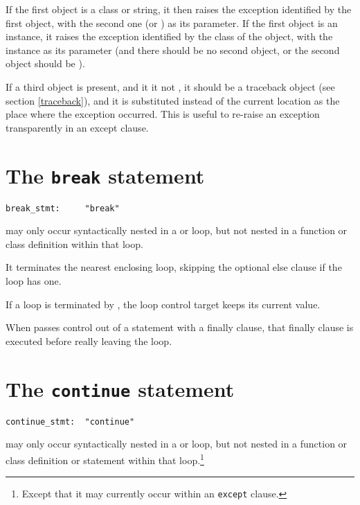 If the first object is a class or string, it then raises the exception
identified by the first object, with the second one (or )
as its parameter.  If the first object is an instance, it raises the
exception identified by the class of the object, with the instance as
its parameter (and there should be no second object, or the second
object should be ).

If a third object is present, and it it not , it should be
a traceback object (see section \ref{traceback}), and it is
substituted instead of the current location as the place where the
exception occurred.  This is useful to re-raise an exception
transparently in an except clause.

\section{The {\tt break} statement}

\begin{verbatim}
break_stmt:     "break"
\end{verbatim}

 may only occur syntactically nested in a 
or  loop, but not nested in a function or class definition
within that loop.

It terminates the nearest enclosing loop, skipping the optional
else clause if the loop has one.

If a  loop is terminated by , the loop control
target keeps its current value.

When  passes control out of a  statement
with a finally clause, that finally clause is executed
before really leaving the loop.

\section{The {\tt continue} statement}

\begin{verbatim}
continue_stmt:  "continue"
\end{verbatim}

 may only occur syntactically nested in a  or
 loop, but not nested in a function or class definition or
 statement within that loop.\footnote{Except that it may
currently occur within an {\tt except} clause.}

